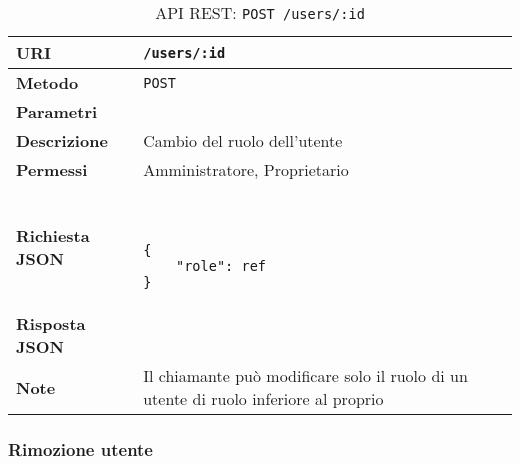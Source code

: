         \begin{table}[H]
            \begin{center}
                \begin{tabular}{p{} p{}}
                    \toprule
                    \textbf{URI} & \texttt{/users/:id} \\ \midrule
                    \textbf{Metodo} & \texttt{POST} \\ \midrule
                    \textbf{Parametri} & \\ \midrule
                    \textbf{Descrizione} & Cambio del ruolo dell'utente \\ \midrule
                    \textbf{Permessi} & Amministratore, Proprietario  \\ \midrule
                    \textbf{Richiesta JSON} & \
                        \begin{lstlisting}[basicstyle={\ttfamily}]
{
    "role": ref
}
                        \end{lstlisting}
                        \\ \midrule
                    \textbf{Risposta JSON} & \\ \midrule
                    \textbf{Note} & Il chiamante può modificare solo il ruolo di un utente di ruolo
                        inferiore al proprio \\
                    \bottomrule
                \end{tabular}
                \caption{API REST: \texttt{POST /users/:id}}
            \end{center}
        \end{table}

    \subsubsection{Rimozione utente}

